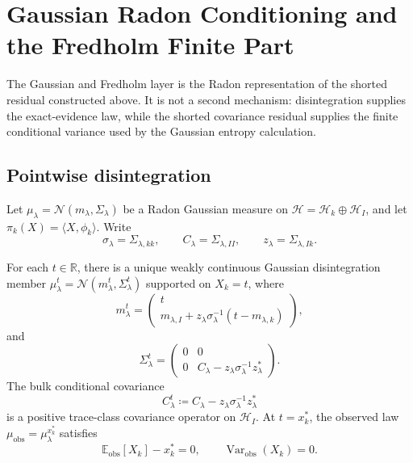 \section{Gaussian Radon Conditioning and the Fredholm Finite Part}
\label{app:gaussian_fredholm}

The Gaussian and Fredholm layer is the Radon representation of the shorted
residual constructed above.  It is not a second mechanism: disintegration
supplies the exact-evidence law, while the shorted covariance residual supplies
the finite conditional variance used by the Gaussian entropy calculation.

\subsection{Pointwise disintegration}

Let $\mu_\lambda=\mathcal{N}(m_\lambda,\Sigma_\lambda)$ be a Radon Gaussian
measure on $\mathcal{H}=\mathcal{H}_k\oplus\mathcal{H}_I$, and let
$\pi_k(X)=\langle X,\phi_k\rangle$.  Write
\[
  \sigma_\lambda=\Sigma_{\lambda,kk},
  \qquad
  C_\lambda=\Sigma_{\lambda,II},
  \qquad
  z_\lambda=\Sigma_{\lambda,Ik}.
\]

\begin{lemma}
\label{lem:disintegration}
For each $t\in\mathbb{R}$, there is a unique weakly continuous Gaussian
disintegration member
$\mu_\lambda^t=\mathcal{N}(m_\lambda^t,\Sigma_\lambda^t)$ supported on
$X_k=t$, where
\[
  m_\lambda^t=
  \begin{pmatrix}
    t\\
    m_{\lambda,I}
    +z_\lambda\sigma_\lambda^{-1}(t-m_{\lambda,k})
  \end{pmatrix},
\]
and
\begin{equation}
  \Sigma_\lambda^t=
  \begin{pmatrix}
    0&0\\
    0&C_\lambda-z_\lambda\sigma_\lambda^{-1}z_\lambda^*
  \end{pmatrix}.
  \label{eq:conditional_covariance_block}
\end{equation}
The bulk conditional covariance
\begin{equation}
  C_\lambda^t
  \coloneqq
  C_\lambda-z_\lambda\sigma_\lambda^{-1}z_\lambda^*
  \label{eq:bulk_conditional_covariance}
\end{equation}
is a positive trace-class covariance operator on $\mathcal{H}_I$.
At $t=x_k^*$, the observed law $\mu_{\mathrm{obs}}=\mu_\lambda^{x_k^*}$
satisfies
\[
  \mathbb{E}_{\mathrm{obs}}[X_k]-x_k^*=0,
  \qquad
  \operatorname{Var}_{\mathrm{obs}}(X_k)=0.
\]
\end{lemma}


